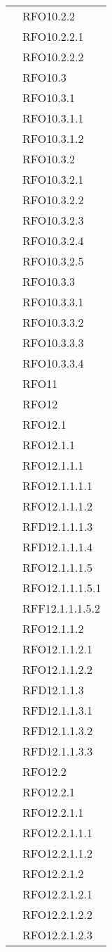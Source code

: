 \begin{longtable}{ p{12cm} | p{4cm} }
& RFO10.2.2 \\
& RFO10.2.2.1 \\
& RFO10.2.2.2 \\
& RFO10.3 \\
& RFO10.3.1 \\
& RFO10.3.1.1 \\
& RFO10.3.1.2 \\
& RFO10.3.2 \\
& RFO10.3.2.1 \\
& RFO10.3.2.2 \\
& RFO10.3.2.3 \\
& RFO10.3.2.4 \\
& RFO10.3.2.5 \\
& RFO10.3.3 \\
& RFO10.3.3.1 \\
& RFO10.3.3.2 \\
& RFO10.3.3.3 \\
& RFO10.3.3.4 \\
& RFO11 \\
	& RFO12 \\
& RFO12.1 \\
& RFO12.1.1 \\
& RFO12.1.1.1 \\
& RFO12.1.1.1.1 \\
& RFO12.1.1.1.2 \\
& RFD12.1.1.1.3 \\
& RFD12.1.1.1.4 \\
& RFO12.1.1.1.5 \\
& RFO12.1.1.1.5.1 \\
& RFF12.1.1.1.5.2 \\
& RFO12.1.1.2 \\
& RFO12.1.1.2.1 \\
& RFO12.1.1.2.2 \\
& RFD12.1.1.3 \\
& RFD12.1.1.3.1 \\
& RFD12.1.1.3.2 \\
& RFD12.1.1.3.3 \\
& RFO12.2 \\
& RFO12.2.1 \\
& RFO12.2.1.1 \\
& RFO12.2.1.1.1 \\
& RFO12.2.1.1.2 \\
& RFO12.2.1.2 \\
& RFO12.2.1.2.1 \\
& RFO12.2.1.2.2 \\
& RFO12.2.1.2.3 \\

\end{longtable}
